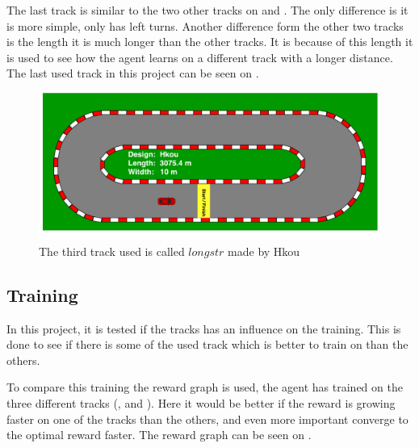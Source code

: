 The last track is similar to the two other tracks on  and . The only difference is it is more simple, only has left turns. Another difference form the other two tracks is the length it is much longer than the other tracks. It is because of this length it is used to see how the agent learns on a different track with a longer distance. The last used track in this project can be seen on . 

\begin{figure}[H]
	\centering
	\includegraphics[width=1\textwidth]{Figures/Result/track_longstr.pdf}
	\caption{The third track used is called $longstr$ made by Hkou}
	\label{fig:track_longstr}
\end{figure}


\subsection*{Training}
In this project, it is tested if the tracks has an influence on the training. This is done to see if there is some of the used track which is better to train on than the others.

To compare this training the reward graph is used, the agent has trained on the three different tracks (,  and ). Here it would be better if the reward is growing faster on one of the tracks than the others, and even more important converge to the optimal reward faster. The reward graph can be seen on .

